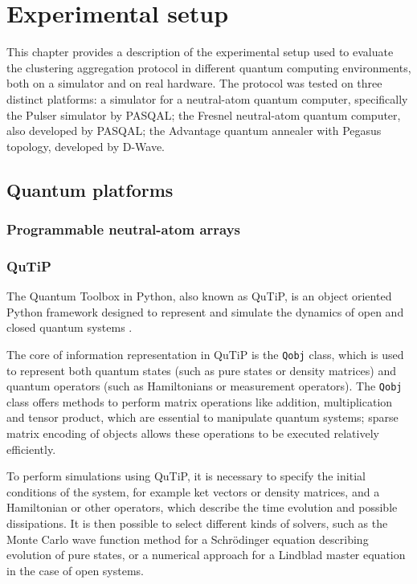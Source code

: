 \chapter{Experimental setup}
This chapter provides a description of the experimental setup used to evaluate the clustering aggregation protocol in different quantum computing environments, both on a simulator and on real hardware. The protocol was tested on three distinct platforms: a simulator for a neutral-atom quantum computer, specifically the Pulser simulator by PASQAL; the Fresnel neutral-atom quantum computer, also developed by PASQAL; the Advantage quantum annealer with Pegasus topology, developed by D-Wave.

\section{Quantum platforms}
\subsection{Programmable neutral-atom arrays}

\subsection{QuTiP}
The Quantum Toolbox in Python, also known as QuTiP, is an object oriented Python framework designed to represent and simulate the dynamics of open and closed quantum systems \cite{Johansson2012}. 

The core of information representation in QuTiP is the \texttt{Qobj} class, which is used to represent both quantum states (such as pure states or density matrices) and quantum operators (such as Hamiltonians or measurement operators). The \texttt{Qobj} class offers methods to perform matrix operations like addition, multiplication and tensor product, which are essential to manipulate quantum systems; sparse matrix encoding of objects allows these operations to be executed relatively efficiently.

To perform simulations using QuTiP, it is necessary to specify the initial conditions of the system, for example ket vectors or density matrices, and a Hamiltonian or other operators, which describe the time evolution and possible dissipations. It is then possible to select different kinds of solvers, such as the Monte Carlo wave function method for a Schrödinger equation describing evolution of pure states, or a numerical approach for a Lindblad master equation in the case of open systems.

